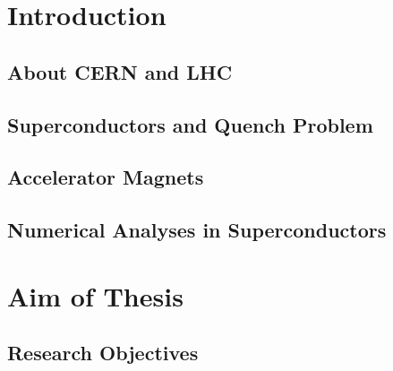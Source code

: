 \documentclass[11pt,a4paper]{report}
\begin{document}


\setcounter{page}{1}
\clearpage\thispagestyle{empty}
\tableofcontents
\clearpage\thispagestyle{empty}

% 

\chapter{Introduction}
\label{chapter: introduction}

\section{About CERN and LHC}
\label{section: about cern}


\section{Superconductors and Quench Problem}
\label{section: superconductors}


\section{Accelerator Magnets}
\label{section: accelerator_magnets}


\section{Numerical Analyses in Superconductors}
\label{section: numerical_analyses_in_superconductors}


\clearpage \thispagestyle{empty}
\chapter{Aim of Thesis}
\label{chapter: aim_thesis}

\section{Research Objectives}

\end{document}
